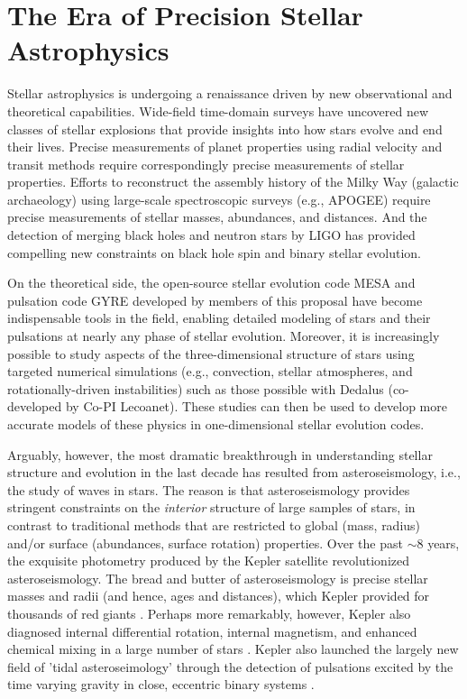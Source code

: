 \section{The Era of Precision Stellar Astrophysics}

Stellar astrophysics is undergoing a renaissance driven by new observational and theoretical capabilities. Wide-field time-domain surveys have uncovered new classes of stellar explosions that provide insights into how stars evolve and end their lives.  Precise measurements of planet properties using radial velocity and transit methods require correspondingly precise measurements of stellar properties. Efforts to reconstruct the assembly history of the Milky Way (galactic archaeology) using large-scale spectroscopic surveys (e.g., APOGEE) require precise measurements of stellar masses, abundances, and distances. And the detection of merging black holes and neutron stars by LIGO has provided compelling new constraints on black hole spin and binary stellar evolution.   

On the theoretical side, the open-source stellar evolution code MESA and pulsation code GYRE developed by members of this proposal have become indispensable tools in the field, enabling detailed modeling of stars and their pulsations at nearly any phase of stellar evolution.  Moreover, it is increasingly possible to study aspects of the three-dimensional structure of stars using targeted numerical simulations (e.g., convection, stellar atmospheres, and rotationally-driven instabilities) such as those possible with Dedalus (co-developed by Co-PI Lecoanet). These studies can then be used to develop more accurate models of these physics in one-dimensional stellar evolution codes.

Arguably, however, the most dramatic breakthrough in understanding stellar structure and evolution in the last decade has resulted from asteroseismology, i.e., the study of waves in stars.  The reason is that asteroseismology provides stringent constraints on the {\em interior} structure of large samples of stars, in contrast to traditional methods that are restricted to global (mass, radius) and/or surface (abundances, surface rotation) properties. Over the past $\sim 8$ years, the exquisite photometry produced by the Kepler satellite revolutionized asteroseismology.  The bread and butter of asteroseismology is precise stellar masses and radii (and hence, ages and distances), which Kepler provided for thousands of red giants \citep{stello:13}. Perhaps more remarkably, however, Kepler also diagnosed internal differential rotation, internal magnetism, and enhanced chemical mixing in a large number of stars \citep{Mosser_2012,fuller:15,deheuvels:14,stello:16,moravveji:16,vanreeth:16}.  Kepler also launched the largely new field of 'tidal asteroseimology' through the detection of pulsations excited by the time varying gravity in close, eccentric binary systems \citep{fullerkoi54:12,Burkart_2012,Fuller_2017}.

